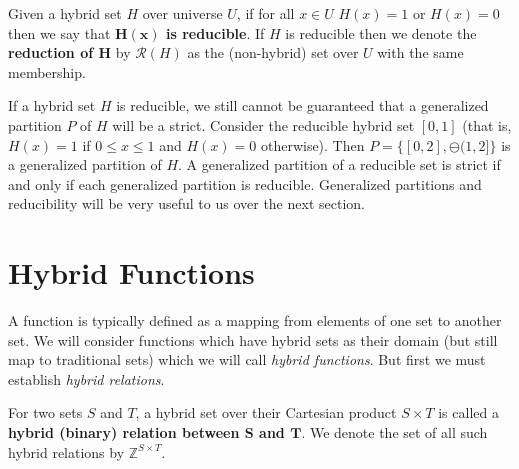 \begin{definition}
	Given a hybrid set $H$ over universe $U$, 
	if for all $x \in U$ $H(x)=1$ or $H(x)=0$ then we say that \textbf{$\boldsymbol{H(x)}$ is reducible}.
	If $H$ is reducible then we denote the \textbf{reduction of $\boldsymbol{H}$} by $\mathcal{R}(H)$ 
	as the (non-hybrid) set over $U$ with the same membership.  
\end{definition}


If a hybrid set $H$ is reducible, we still cannot be guaranteed that a generalized partition $P$ of $H$ will be a strict.
Consider the reducible hybrid set $[0,1]$ (that is, $H(x)=1$ if $0 \leq x \leq 1$ and $H(x)=0$ otherwise).
Then $P = \big\{ [0,2], \ominus (1,2] \big\}$ is a generalized partition of $H$. 
A generalized partition of a reducible set is strict if and only if each generalized partition is reducible.
Generalized partitions and reducibility will be very useful to us over the next section.




%
%
\section{Hybrid Functions}


A function is typically defined as a mapping from elements of one set to another set.
We will consider functions which have hybrid sets as their domain (but still map to traditional sets) 
which we will call \emph{hybrid functions}.
But first we must establish \emph{hybrid relations}.

\begin{definition}
	For two sets $S$ and $T$, a hybrid set over their Cartesian product $S \times T$ is called a 
	\textbf{hybrid (binary) relation between $\boldsymbol{S}$ and $\boldsymbol{T}$}.
	We denote the set of all such hybrid relations by $\mathbb{Z}^{S \times T}$. 
\end{definition}



